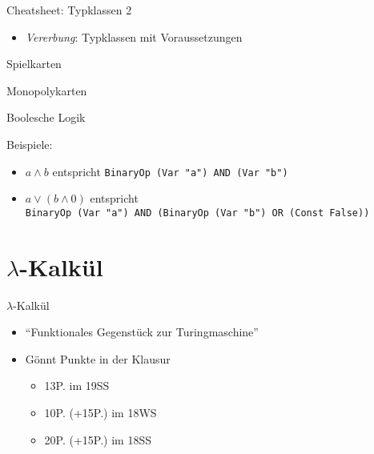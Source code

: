 \documentclass{beamer}
\begin{document}
\begin{frame}{Cheatsheet: Typklassen 2}
  \begin{itemize}
    \item \emph{Vererbung}: Typklassen mit Voraussetzungen
  \end{itemize}

\end{frame}

\begin{frame}{Spielkarten}
\end{frame}

\begin{frame}{Monopolykarten}
\end{frame}

\begin{frame}{Boolesche Logik}

  \vfill

  Beispiele:
  \begin{itemize}
    \item $a \wedge b$ entspricht \texttt{BinaryOp (Var "{}a"{}) AND (Var "{}b"{})}
    \item $a \vee (b \wedge 0)$ entspricht\\
          \texttt{BinaryOp (Var "{}a"{}) AND (BinaryOp (Var "{}b"{}) OR (Const False))}
  \end{itemize}
\end{frame}

\section{$\lambda$-Kalkül}

\begin{frame}{$\lambda$-Kalkül}
	\begin{itemize}
                \item \enquote{Funktionales Gegenstück zur Turingmaschine}
		\item Gönnt Punkte in der Klausur
		\begin{itemize}
			\item 13P. im 19SS
			\item 10P. (+15P.) im 18WS
			\item 20P. (+15P.) im 18SS
		\end{itemize}
	\end{itemize}
\end{frame}
\end{document}
